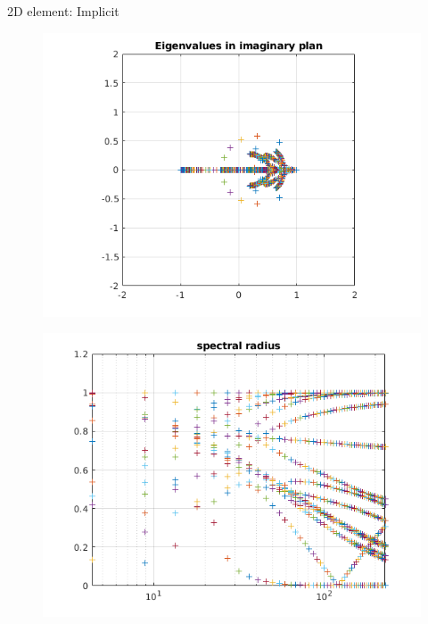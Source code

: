 \begin{frame}{2D element: Implicit}
\begin{figure}[ht] 
  \label{ fig7} 
  \begin{minipage}[b]{0.5\linewidth}
    \centering
    \includegraphics[scale=.4]{images/2Dpml-imp-1.png} \\

  \end{minipage}%
  \begin{minipage}[b]{0.5\linewidth}
    \centering
    \includegraphics[scale=.4]{images/2Dpml-imp-2.png} \\
  \end{minipage} 

\end{figure}
\end{frame}

